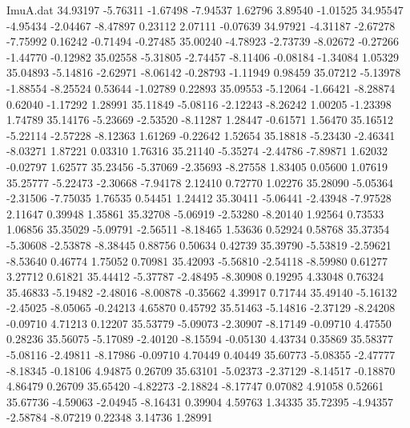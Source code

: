 \begin{filecontents}{ImuA.dat}
  34.93197   -5.76311   -1.67498   -7.94537    1.62796    3.89540   -1.01525
  34.95547   -4.95434   -2.04467   -8.47897    0.23112    2.07111   -0.07639
  34.97921   -4.31187   -2.67278   -7.75992    0.16242   -0.71494   -0.27485
  35.00240   -4.78923   -2.73739   -8.02672   -0.27266   -1.44770   -0.12982
  35.02558   -5.31805   -2.74457   -8.11406   -0.08184   -1.34084    1.05329
  35.04893   -5.14816   -2.62971   -8.06142   -0.28793   -1.11949    0.98459
  35.07212   -5.13978   -1.88554   -8.25524    0.53644   -1.02789    0.22893
  35.09553   -5.12064   -1.66421   -8.28874    0.62040   -1.17292    1.28991
  35.11849   -5.08116   -2.12243   -8.26242    1.00205   -1.23398    1.74789
  35.14176   -5.23669   -2.53520   -8.11287    1.28447   -0.61571    1.56470
  35.16512   -5.22114   -2.57228   -8.12363    1.61269   -0.22642    1.52654
  35.18818   -5.23430   -2.46341   -8.03271    1.87221    0.03310    1.76316
  35.21140   -5.35274   -2.44786   -7.89871    1.62032   -0.02797    1.62577
  35.23456   -5.37069   -2.35693   -8.27558    1.83405    0.05600    1.07619
  35.25777   -5.22473   -2.30668   -7.94178    2.12410    0.72770    1.02276
  35.28090   -5.05364   -2.31506   -7.75035    1.76535    0.54451    1.24412
  35.30411   -5.06441   -2.43948   -7.97528    2.11647    0.39948    1.35861
  35.32708   -5.06919   -2.53280   -8.20140    1.92564    0.73533    1.06856
  35.35029   -5.09791   -2.56511   -8.18465    1.53636    0.52924    0.58768
  35.37354   -5.30608   -2.53878   -8.38445    0.88756    0.50634    0.42739
  35.39790   -5.53819   -2.59621   -8.53640    0.46774    1.75052    0.70981
  35.42093   -5.56810   -2.54118   -8.59980    0.61277    3.27712    0.61821
  35.44412   -5.37787   -2.48495   -8.30908    0.19295    4.33048    0.76324
  35.46833   -5.19482   -2.48016   -8.00878   -0.35662    4.39917    0.71744
  35.49140   -5.16132   -2.45025   -8.05065   -0.24213    4.65870    0.45792
  35.51463   -5.14816   -2.37129   -8.24208   -0.09710    4.71213    0.12207
  35.53779   -5.09073   -2.30907   -8.17149   -0.09710    4.47550    0.28236
  35.56075   -5.17089   -2.40120   -8.15594   -0.05130    4.43734    0.35869
  35.58377   -5.08116   -2.49811   -8.17986   -0.09710    4.70449    0.40449
  35.60773   -5.08355   -2.47777   -8.18345   -0.18106    4.94875    0.26709
  35.63101   -5.02373   -2.37129   -8.14517   -0.18870    4.86479    0.26709
  35.65420   -4.82273   -2.18824   -8.17747    0.07082    4.91058    0.52661
  35.67736   -4.59063   -2.04945   -8.16431    0.39904    4.59763    1.34335
  35.72395   -4.94357   -2.58784   -8.07219    0.22348    3.14736    1.28991

\end{filecontents}
